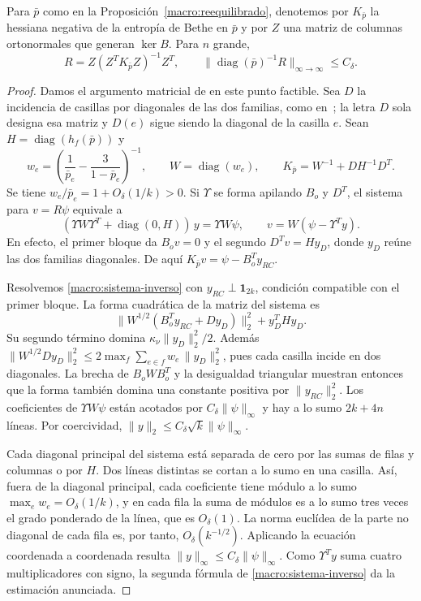 \begin{lema}\label{macro:inversa}
Para $\bar p$ como en la Proposición~\ref{macro:reequilibrado}, denotemos por $K_{\bar p}$ la hessiana
negativa de la entropía de Bethe en $\bar p$ y por $Z$ una matriz de columnas ortonormales que
generan $\ker B$. Para $n$
grande,
\[
 R=Z(Z^TK_{\bar p}Z)^{-1}Z^T,\qquad
 \|\operatorname{diag}(\bar p)^{-1}R\|_{\infty\to\infty}\le C_\delta .
\]
\end{lema}
\begin{proof}
Damos el argumento matricial de \cite[Secciones~6.3, 6.4 y~7.2]{pred} en este punto factible. Sea $D$ la
incidencia de casillas por diagonales de las dos familias, como en~\cite[Sección~6.1]{pred}; la
letra $D$ sola designa esa matriz y $D(e)$ sigue siendo la diagonal de la casilla $e$. Sean
$H=\operatorname{diag}(h_f(\bar p))$ y
\[
 w_e=\left(\frac1{\bar p_e}-\frac3{1-\bar p_e}\right)^{-1},
 \qquad W=\operatorname{diag}(w_e),\qquad
 K_{\bar p}=W^{-1}+DH^{-1}D^T .
\]
Se tiene $w_e/\bar p_e=1+O_\delta(1/k)>0$. Si $\Upsilon$ se forma apilando $B_o$ y $D^T$, el
sistema para $v=R\psi$ equivale a
\begin{equation}\label{macro:sistema-inverso}
 (\Upsilon W\Upsilon^T+\operatorname{diag}(0,H))\,y=\Upsilon W\psi,\qquad
 v=W(\psi-\Upsilon^Ty).
\end{equation}
En efecto, el primer bloque da $B_ov=0$ y el segundo $D^Tv=Hy_D$, donde $y_D$ reúne las dos familias
diagonales. De aquí $K_{\bar p}v=\psi-B_o^Ty_{RC}$.

Resolvemos \eqref{macro:sistema-inverso} con $y_{RC}\perp\mathbf1_{2k}$, condición compatible con el
primer bloque. La forma cuadrática de la matriz del sistema es
\[
 \|W^{1/2}(B_o^Ty_{RC}+Dy_D)\|_2^2+y_D^THy_D .
\]
Su segundo término domina $\kappa_\nu\|y_D\|_2^2/2$. Además
$\|W^{1/2}Dy_D\|_2^2\le 2\max_f\sum_{e\in f}w_e\,\|y_D\|_2^2$,
pues cada casilla incide en dos diagonales. La brecha de $B_oWB_o^T$ y la desigualdad triangular
muestran entonces que la forma también domina una constante positiva por $\|y_{RC}\|_2^2$. Los
coeficientes de $\Upsilon W\psi$ están acotados por $C_\delta\|\psi\|_\infty$ y hay a lo sumo $2k+4n$
líneas. Por coercividad,
$\|y\|_2\le C_\delta\sqrt{k}\|\psi\|_\infty$.

Cada diagonal principal del sistema está separada de cero por las sumas de filas y columnas o por
$H$. Dos líneas distintas se cortan a lo sumo en una casilla. Así, fuera de la diagonal principal,
cada coeficiente tiene módulo a lo sumo $\max_e w_e=O_\delta(1/k)$, y en cada fila la suma de módulos
es a lo sumo tres veces el grado ponderado de la línea, que es $O_\delta(1)$. La norma euclídea de la
parte no diagonal de cada fila es, por tanto, $O_\delta(k^{-1/2})$. Aplicando la ecuación coordenada a
coordenada resulta $\|y\|_\infty\le C_\delta\|\psi\|_\infty$. Como $\Upsilon^Ty$ suma cuatro
multiplicadores con signo, la segunda fórmula de \eqref{macro:sistema-inverso} da la estimación anunciada.
\end{proof}

